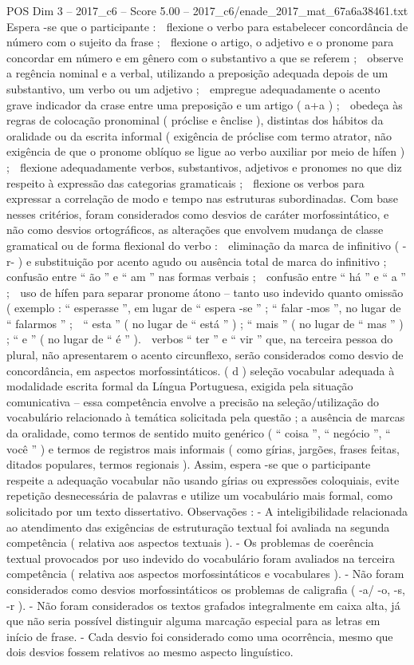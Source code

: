 \begin{textsample}{POS Dim 3 – 2017\_c6 – Score 5.00 – 2017\_c6/enade\_2017\_mat\_67a6a38461.txt}
Espera -se que o participante :  flexione o verbo para estabelecer concordância de número com o sujeito da frase ;  flexione o artigo, o adjetivo e o pronome para concordar em número e em gênero com o substantivo a que se referem ;  observe a regência nominal e a verbal, utilizando a preposição adequada depois de um substantivo, um verbo ou um adjetivo ;  empregue adequadamente o acento grave indicador da crase entre uma preposição e um artigo ( a+a ) ;  obedeça às regras de colocação pronominal ( próclise e ênclise ), distintas dos hábitos da oralidade ou da escrita informal ( exigência de próclise com termo atrator, não exigência de que o pronome oblíquo se ligue ao verbo auxiliar por meio de hífen ) ;  flexione adequadamente verbos, substantivos, adjetivos e pronomes no que diz respeito à expressão das categorias gramaticais ;  flexione os verbos para expressar a correlação de modo e tempo nas estruturas subordinadas.
Com base nesses critérios, foram considerados como desvios de caráter morfossintático, e não como desvios ortográficos, as alterações que envolvem mudança de classe gramatical ou de forma flexional do verbo :  eliminação da marca de infinitivo ( -r- ) e substituição por acento agudo ou ausência total de marca do infinitivo ;  confusão entre “ ão ” e “ am ” nas formas verbais ;  confusão entre “ há ” e “ a ” ;  uso de hífen para separar pronome átono – tanto uso indevido quanto omissão ( exemplo : “ esperasse ”, em lugar de “ espera -se ” ; “ falar -mos ”, no lugar de “ falarmos ” ;  “ esta ” ( no lugar de “ está ” ) ; “ mais ” ( no lugar de “ mas ” ) ; “ e ” ( no lugar de “ é ” ).  verbos “ ter ” e “ vir ” que, na terceira pessoa do plural, não apresentarem o acento circunflexo, serão considerados como desvio de concordância, em aspectos morfossintáticos. ( d ) seleção vocabular adequada à modalidade escrita formal da Língua Portuguesa, exigida pela situação comunicativa – essa competência envolve a precisão na seleção/utilização do vocabulário relacionado à temática solicitada pela questão ; a ausência de marcas da oralidade, como termos de sentido muito genérico ( “ coisa ”, “ negócio ”, “ você ” ) e termos de registros mais informais ( como gírias, jargões, frases feitas, ditados populares, termos regionais ).
Assim, espera -se que o participante respeite a adequação vocabular não usando gírias ou expressões coloquiais, evite repetição desnecessária de palavras e utilize um vocabulário mais formal, como solicitado por um texto dissertativo.
Observações : - A inteligibilidade relacionada ao atendimento das exigências de estruturação textual foi avaliada na segunda competência ( relativa aos aspectos textuais ). - Os problemas de coerência textual provocados por uso indevido do vocabulário foram avaliados na terceira competência ( relativa aos aspectos morfossintáticos e vocabulares ). - Não foram considerados como desvios morfossintáticos os problemas de caligrafia ( -a/ -o, -s, -r ). - Não foram considerados os textos grafados integralmente em caixa alta, já que não seria possível distinguir alguma marcação especial para as letras em início de frase. - Cada desvio foi considerado como uma ocorrência, mesmo que dois desvios fossem relativos ao mesmo aspecto linguístico.

\end{textsample}
